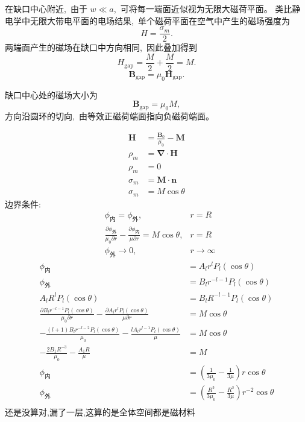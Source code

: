 在缺口中心附近, \,由于 $w \ll a$, \,可将每一端面近似视为无限大磁荷平面。
类比静电学中无限大带电平面的电场结果, \,单个磁荷平面在空气中产生的磁场强度为
\[
H = \frac{\sigma_m}{2}.
\]
两端面产生的磁场在缺口中方向相同, \,因此叠加得到
\[
H_{\text{gap}} = \frac{M}{2} + \frac{M}{2} = M.
\]
\[
\boldsymbol B_{\text{gap}} = \mu_0 \boldsymbol H_{\text{gap}}.
\]



缺口中心处的磁场大小为
\[
\boldsymbol B_{\text{gap}} = \mu_0 M,
\]
方向沿圆环的切向, \,由等效正磁荷端面指向负磁荷端面。

\begin{align*}
    \boldsymbol H&=\frac{\boldsymbol B_0}{\mu_0}-\boldsymbol M\\
    \rho_m&= \boldsymbol\nabla\cdot\boldsymbol H \\
    \rho_m&=0 \\
    \sigma_m &= \boldsymbol M\cdot \boldsymbol n\\
    \sigma_m &=M\cos\theta
\end{align*}
边界条件:
\begin{align*}
    &\phi_\text{内}=\phi_\text{外},&r=R\\
    &\frac{\partial \phi_\text{外}}{\mu_0\partial r}
    -\frac{\partial \phi_\text{内}}{\mu\partial r}
    =M\cos\theta,&r=R\\
    &\phi_\text{外}\to 0,&r\to\infty
\end{align*}
\begin{align*}
    \phi_\text{内}&=A_lr^lP_l(\cos\theta)\\
    \phi_\text{外}&=B_lr^{-l-1}P_l(\cos\theta)\\
    A_lR^lP_l(\cos\theta)&=B_lR^{-l-1}P_l(\cos\theta)\\
    \frac{\partial B_lr^{-l-1}P_l(\cos\theta)}{\mu_0\partial r}
    -\frac{\partial A_lr^lP_l(\cos\theta)}{\mu\partial r}
    &=M\cos\theta\\
    -\frac{(l+1)B_lr^{-l-2}P_l(\cos\theta)}{\mu_0}
    -\frac{lA_lr^{l-1}P_l(\cos\theta)}{\mu}
    &=M\cos\theta\\
    -\frac{2B_1R^{-3}}{\mu_0}
    -\frac{A_1R}{\mu}
    &=M\\
    \phi_\text{内}&=(\frac{1}{3\mu_0}-\frac{1}{3\mu})r\cos\theta\\
    \phi_\text{外}&=(\frac{R^3}{3\mu_0}-\frac{R^3}{3\mu})r^{-2}\cos\theta\\
\end{align*}
还是没算对,漏了一层,这算的是全体空间都是磁材料
\newpage
